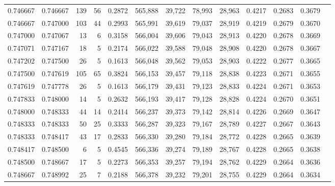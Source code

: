 \begin{tabular}{rrrrrrrrrrrrr}
0.746667 & 0.746667 &   139 &  56 &                                     0.2872 & 565,888 &  39,722 &  78,993 &  28,963 & 0.4217 & 0.2683 & 0.3679 \\
0.746667 & 0.747000 &   103 &  44 &                                     0.2993 & 565,991 &  39,619 &  79,037 &  28,919 & 0.4219 & 0.2679 & 0.3670 \\
0.747000 & 0.747067 &    13 &   6 &                                     0.3158 & 566,004 &  39,606 &  79,043 &  28,913 & 0.4220 & 0.2678 & 0.3669 \\
0.747071 & 0.747167 &    18 &   5 &                                     0.2174 & 566,022 &  39,588 &  79,048 &  28,908 & 0.4220 & 0.2678 & 0.3667 \\
0.747202 & 0.747500 &    26 &   5 &                                     0.1613 & 566,048 &  39,562 &  79,053 &  28,903 & 0.4222 & 0.2677 & 0.3665 \\
0.747500 & 0.747619 &   105 &  65 &                                     0.3824 & 566,153 &  39,457 &  79,118 &  28,838 & 0.4223 & 0.2671 & 0.3655 \\
0.747619 & 0.747778 &    26 &   5 &                                     0.1613 & 566,179 &  39,431 &  79,123 &  28,833 & 0.4224 & 0.2671 & 0.3653 \\
0.747833 & 0.748000 &    14 &   5 &                                     0.2632 & 566,193 &  39,417 &  79,128 &  28,828 & 0.4224 & 0.2670 & 0.3651 \\
0.748000 & 0.748333 &    44 &  14 &                                     0.2414 & 566,237 &  39,373 &  79,142 &  28,814 & 0.4226 & 0.2669 & 0.3647 \\
0.748333 & 0.748333 &    50 &  25 &                                     0.3333 & 566,287 &  39,323 &  79,167 &  28,789 & 0.4227 & 0.2667 & 0.3643 \\
0.748333 & 0.748417 &    43 &  17 &                                     0.2833 & 566,330 &  39,280 &  79,184 &  28,772 & 0.4228 & 0.2665 & 0.3639 \\
0.748417 & 0.748500 &     6 &   5 &                                     0.4545 & 566,336 &  39,274 &  79,189 &  28,767 & 0.4228 & 0.2665 & 0.3638 \\
0.748500 & 0.748667 &    17 &   5 &                                     0.2273 & 566,353 &  39,257 &  79,194 &  28,762 & 0.4229 & 0.2664 & 0.3636 \\
0.748667 & 0.748992 &    25 &   7 &                                     0.2188 & 566,378 &  39,232 &  79,201 &  28,755 & 0.4229 & 0.2664 & 0.3634 \\

\end{tabular}
